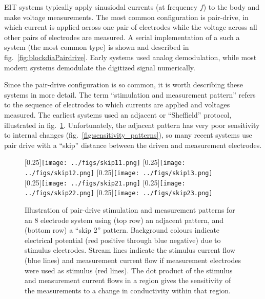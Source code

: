 \documentclass[12pt]{article} \usepackage[margin=3cm]{geometry} \usepackage[margin=20pt,font=small,labelfont=bf]{caption}\def\TBLWIDA{35mm}\def\TBLWIDB{95mm}
\newcommand\fref[1]{fig.\ \ref{#1}}
\begin{document}
EIT systems typically apply sinusiodal currents (at frequency $f$) to the
body and make voltage measurements. The most common configuration
is pair-drive, in which current is applied across one pair
of electrodes while the voltage across all other pairs
of electrodes are measured. A serial implementation
of a such a system (the most common type) is shown
and described in \fref{fig:blockdiaPairdrive}.
 Early systems used analog demodulation,
while most modern systems demodulate the digitized signal
numerically.

Since the pair-drive configuration is so common, it is worth
describing these systems in more detail. The term ``stimulation
and measurement pattern'' refers to the sequence of electrodes
to which currents are applied and voltages measured. The earliest
systems used an adjacent or ``Sheffield'' protocol, illustrated
in \fref{fig:stim_meas_patterns}. Unfortunately, the adjacent
pattern has very poor sensitivity to internal changes \cite{Adler2011Adjacent}
(\fref{fig:sensitivity_patterns}), so many recent systems use pair drive
with a ``skip'' distance between the driven and measurement electrodes.

\begin{figure} \centering
   [0.25\columnwidth]{\texttt{[image: ../figs/skip11.png]}}\hfil%
   [0.25\columnwidth]{\texttt{[image: ../figs/skip12.png]}}\hfil%
   [0.25\columnwidth]{\texttt{[image: ../figs/skip13.png]}}\\
   [0.25\columnwidth]{\texttt{[image: ../figs/skip21.png]}}\hfil
   [0.25\columnwidth]{\texttt{[image: ../figs/skip22.png]}}\hfil
   [0.25\columnwidth]{\texttt{[image: ../figs/skip23.png]}}\\
\caption{%
Illustration of pair-drive stimulation and measurement patterns for an 8
   electrode system using (top row) an adjacent pattern, and (bottom row) a
   ``skip 2'' pattern. Background colours indicate electrical potential (red positive through blue negative)
   due to stimulus electrodes. Stream lines indicate the stimulus current flow
   (blue lines) and measurement current flow if measurement electrodes were
   used as stimulus (red lines). The dot product of the stimulus and
   measurement current flows in a region gives the sensitivity of the measurements
   to a change in conductivity within that region.
}
\label{fig:stim_meas_patterns}
\end{figure}
\end{document}

